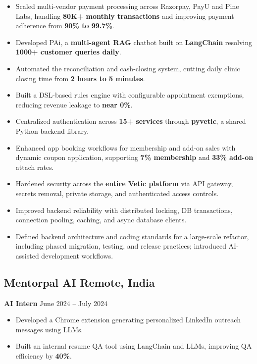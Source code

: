 \documentclass[a4paper,11pt]{article}
\begin{document}
\begin{itemize}
    \item Scaled multi-vendor payment processing across Razorpay, PayU and Pine Labs, handling \textbf{80K+ monthly transactions} and improving payment adherence from \textbf{90\% to 99.7\%}.

    \item Developed PAi, a \textbf{multi-agent RAG} chatbot built on  \textbf{LangChain} resolving \textbf{1000+ customer queries daily}.

    \item Automated the reconciliation and cash-closing system, cutting daily clinic closing time from \textbf{2 hours to 5 minutes}.

    \item Built a DSL-based rules engine with configurable appointment exemptions, reducing revenue leakage to \textbf{near 0\%}.

    \item Centralized authentication across \textbf{15+ services} through \textbf{pyvetic}, a shared Python backend library.

    \item Enhanced app booking workflows for membership and add-on sales with dynamic coupon application, supporting \textbf{7\% membership} and \textbf{33\% add-on} attach rates.

    \item Hardened security across the \textbf{entire Vetic platform} via API gateway, secrets removal, private storage, and authenticated access controls.

    \item Improved backend reliability with distributed locking, DB transactions, connection pooling, caching, and async database clients.

    \item Defined backend architecture and coding standards for a large-scale refactor, including phased migration, testing, and release practices; introduced AI-assisted development workflows.
\end{itemize}
\vspace{-5mm}

\subsection*{Mentorpal AI \hfill \textnormal{Remote, India}}
\noindent\textbf{AI Intern} \hfill June 2024 -- July 2024
\begin{itemize}
    \item Developed a Chrome extension generating personalized LinkedIn outreach messages using LLMs.
    \item Built an internal resume QA tool using LangChain and LLMs, improving QA efficiency by \textbf{40\%}.
\end{itemize}
\vspace{-5mm}
\end{document}
